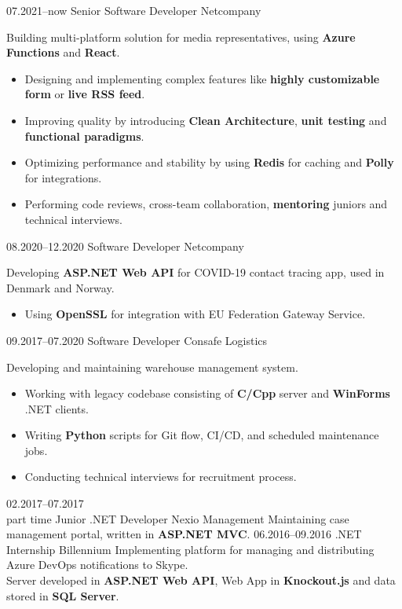 \documentclass[9pt]{developercv} %
\begin{document}
\begin{entrylist}
	\entry
		{07.2021--now}
		{Senior Software Developer}
		{Netcompany}
		{
		  Building multi-platform solution for media representatives, using \textbf{Azure Functions} and \textbf{React}.
		  \begin{itemize}
		  	\setlength\itemsep{0pt}
			\itemindent=-13pt
			\item Designing and implementing complex features like \textbf{highly customizable form} or \textbf{live RSS feed}.
			\item Improving quality by introducing \textbf{Clean Architecture}, \textbf{unit testing} and \textbf{functional paradigms}.
			\item Optimizing performance and stability by using \textbf{Redis} for caching and \textbf{Polly} for integrations.
			\item Performing code reviews, cross-team collaboration, \textbf{mentoring} juniors and technical interviews.
		  \end{itemize}
		}
	\entry
		{08.2020--12.2020}
		{Software Developer}
		{Netcompany}
		{
		  Developing \textbf{ASP.NET Web API} for COVID-19 contact tracing app, used in Denmark and Norway.
		  \begin{itemize}
		  	\setlength\itemsep{0pt}
			\itemindent=-13pt
			\item Using \textbf{OpenSSL} for integration with EU Federation Gateway Service.
		  \end{itemize}
		}
	\entry
		{09.2017--07.2020}
		{Software Developer}
		{Consafe Logistics}
		{
		  Developing and maintaining warehouse management system.
		  \begin{itemize}
		  	\setlength\itemsep{0pt}
			\itemindent=-13pt
			\item Working with legacy codebase consisting of \textbf{C/Cpp} server and \textbf{WinForms} .NET clients.
			\item Writing \textbf{Python} scripts for Git flow, CI/CD, and scheduled maintenance jobs.
			\item Conducting technical interviews for recruitment process. 
		  \end{itemize}
		}
	\entry
		{02.2017--07.2017\\\footnotesize{part time}}
		{Junior .NET Developer}
		{Nexio Management}
		{
		  Maintaining case management portal, written in \textbf{ASP.NET MVC}.
		}
	\entry
		{06.2016--09.2016}
		{.NET Internship}
		{Billennium}
		{
		  Implementing platform for managing and distributing Azure DevOps notifications to Skype.\\
		  Server developed in \textbf{ASP.NET Web API}, Web App in \textbf{Knockout.js} and data stored in \textbf{SQL Server}.
		}

\end{entrylist}
\end{document}
